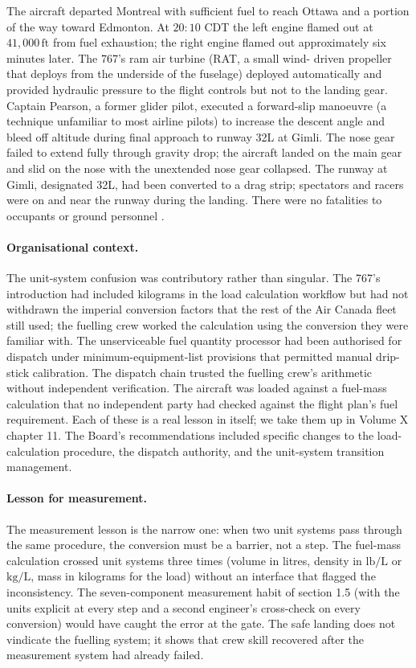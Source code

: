 The aircraft departed Montreal with sufficient fuel to reach
Ottawa and a portion of the way toward Edmonton. At
$20{:}10$ CDT the left engine flamed out at $41{,}000\,\text{ft}$
from fuel exhaustion; the right engine flamed out approximately
six minutes later. The 767's ram air turbine (RAT, a small wind-
driven propeller that deploys from the underside of the
fuselage) deployed automatically and provided hydraulic pressure
to the flight controls but not to the landing gear. Captain
Pearson, a former glider pilot, executed a forward-slip
manoeuvre (a technique unfamiliar to most airline pilots) to
increase the descent angle and bleed off altitude during final
approach to runway 32L at Gimli. The nose gear failed to extend
fully through gravity drop; the aircraft landed on the main gear
and slid on the nose with the unextended nose gear collapsed.
The runway at Gimli, designated 32L, had been converted to a
drag strip; spectators and racers were on and near the runway
during the landing. There were no fatalities to occupants or
ground personnel \cite{acc:lockwood-gimli1985}.

\paragraph{Organisational context.} The unit-system confusion was
contributory rather than singular. The 767's introduction had
included kilograms in the load calculation workflow but had not
withdrawn the imperial conversion factors that the rest of the
Air Canada fleet still used; the fuelling crew worked the calculation
using the conversion they were familiar with. The unserviceable
fuel quantity processor had been authorised for dispatch under
minimum-equipment-list provisions that permitted manual drip-stick
calibration. The dispatch chain trusted the fuelling crew's
arithmetic without independent verification. The aircraft was
loaded against a fuel-mass calculation that no independent party
had checked against the flight plan's fuel requirement. Each of
these is a real lesson in itself; we take them up in Volume X
chapter 11. The Board's recommendations included specific changes
to the load-calculation procedure, the dispatch authority, and the
unit-system transition management.

\paragraph{Lesson for measurement.} The measurement lesson is the
narrow one: when two unit systems pass through the same procedure,
the conversion must be a barrier, not a step. The fuel-mass
calculation crossed unit systems three times (volume in litres,
density in $\text{lb/L}$ or $\si{\kilogram\per\liter}$, mass in
kilograms for the load) without an interface that flagged the
inconsistency. The seven-component measurement habit of section
1.5 (with the units explicit at every step and a second engineer's
cross-check on every conversion) would have caught the error at the
gate. The safe landing does not vindicate the fuelling system; it
shows that crew skill recovered after the measurement system had
already failed.

